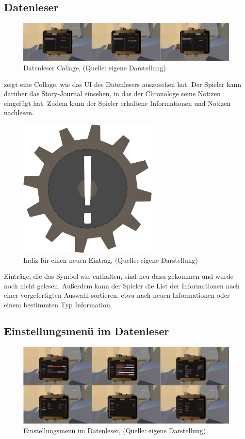 \subsection{Datenleser}\label{sec:datenleser_ui}

\begin{figure}[ht]
\centering
\includegraphics[width=1\linewidth]{content/pictures/Datenleser_c.jpg}
\caption{Datenleser Collage, (Quelle: eigene Darstellung)}
\label{fig:datenleser_collage}
\end{figure}

 zeigt eine Collage, wie das \ac{UI} des Datenlesers auszusehen hat. Der Spieler kann darüber das Story-Journal einsehen, in das der Chronologe seine Notizen eingefügt hat. Zudem kann der Spieler erhaltene Informationen und Notizen nachlesen. 

\begin{figure}[ht]
\centering
\includegraphics[width=0.2\linewidth]{content/pictures/NeuIndiz.jpg}
\caption{Indiz für einen neuen Eintrag, (Quelle: eigene Darstellung)}
\label{fig:indiz_neu}
\end{figure}

Einträge, die das Symbol aus  enthalten, sind neu dazu gekommen und wurde noch nicht gelesen. Außerdem kann der Spieler die List der Informationen nach einer vorgefertigten Auswahl sortieren, etwa nach neuen Informationen oder einem bestimmten Typ Information.

\subsection{Einstellungsmenü im Datenleser}

\begin{figure}[ht]
\centering
\includegraphics[width=1\linewidth]{content/pictures/PasemneÃ¼ UI.jpg}
\caption{Einstellungsmenü im Datenleser, (Quelle: eigene Darstellung)}
\label{fig:pausemenue_settings}
\end{figure}

